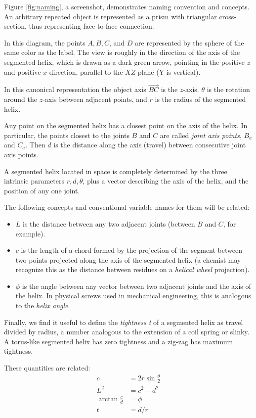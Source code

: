 \documentclass{svproc}
\begin{document}
Figure \ref{fig:naming}, a screenshot, demonstrates naming convention and concepts.
An arbitrary repeated object is represented as a prism
with triangular cross-section,
thus representing face-to-face connection.

In this diagram, the
points $A,B,C$, and $D$ are represented by the sphere of the same color as the label. The view is roughly in the direction of
the axis of the segmented helix, which is drawn as a dark green arrow, pointing in the positive $z$ and positive $x$ direction,
parallel to the $XZ$-plane (Y is vertical).

In this canonical representation the object axis $\overrightarrow{BC}$ is
the $z$-axis.
$\theta$ is the rotation around the $z$-axis
between adjacent points, and
$r$ is the radius of the segmented helix.

Any point on the segmented helix has a closest point on the axis of the helix.
In particular, the points closest to the
joints $B$ and $C$ are called {\em joint axis points}, $B_a$ and $C_a$.
Then $d$ is the distance along the axis (travel) between consecutive joint axis points.

A segmented helix located in space is completely determined by
the three intrinsic parameters $r,d,\theta$, plus
a vector describing the axis
of the helix, and the position of any one joint.

The following concepts and conventional variable names for them will be related:
\begin{itemize}
\item $L$ is the distance between any two adjacent joints (between $B$ and $C$, for example).
  \item $c$ is the length of a chord formed by the projection of the segment between two points projected along the axis of the segmented helix (a chemist may recognize this as the distance between residues on a {\em helical wheel} projection).
\item $\phi$ is the angle between any vector between two adjacent joints and the axis of the helix. In physical screws used in mechanical engineering, this is analogous to the {\em helix angle}.
  \end{itemize}
Finally, we find it useful to define the {\em tightness t} of a segmented helix
as travel divided by radius, a number
analogous to the extension of a coil spring or slinky.
A torus-like segmented helix has zero tightness and a zig-zag has
maximum tightness.

These quantities are related:
\begin{align}
    c &= 2r\sin{\frac{\theta}{2}} \\
    L^2 &= c^2+d^2  \\
    \arctan{\frac{c}{d}}  &= \phi \\
    t &= d / r
\end{align}
\end{document}

